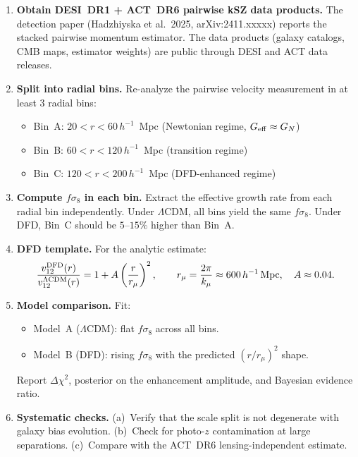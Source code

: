 \documentclass[11pt]{article}
\newcommand{\LCDM}{\Lambda\text{CDM}}
\newcommand{\Geff}{G_{\rm eff}}
\begin{document}
\begin{enumerate}[label=\textbf{K.\arabic*:}]
\item \textbf{Obtain DESI~DR1 + ACT~DR6 pairwise kSZ data products.}
  The detection paper (Hadzhiyska et al.\ 2025, arXiv:2411.xxxxx) reports
  the stacked pairwise momentum estimator. The data products (galaxy
  catalogs, CMB maps, estimator weights) are public through DESI and ACT
  data releases.

\item \textbf{Split into radial bins.} Re-analyze the pairwise velocity
  measurement in at least 3 radial bins:
  \begin{itemize}[nosep]
  \item Bin~A: $20 < r < 60\,h^{-1}$~Mpc (Newtonian regime, $\Geff \approx G_N$)
  \item Bin~B: $60 < r < 120\,h^{-1}$~Mpc (transition regime)
  \item Bin~C: $120 < r < 200\,h^{-1}$~Mpc (DFD-enhanced regime)
  \end{itemize}

\item \textbf{Compute $f\sigma_8$ in each bin.} Extract the effective
  growth rate from each radial bin independently. Under $\LCDM$, all
  bins yield the same $f\sigma_8$. Under DFD, Bin~C should be
  $5$--$15\%$ higher than Bin~A.

\item \textbf{DFD template.} For the analytic estimate:
  \begin{equation}
  \frac{v_{12}^{\rm DFD}(r)}{v_{12}^{\LCDM}(r)} = 1 + A\left(
  \frac{r}{r_\mu}\right)^2, \qquad r_\mu = \frac{2\pi}{k_\mu}
  \approx 600\,h^{-1}\,\text{Mpc}, \quad A \approx 0.04.
  \end{equation}

\item \textbf{Model comparison.} Fit:
  \begin{itemize}[nosep]
  \item Model~A ($\LCDM$): flat $f\sigma_8$ across all bins.
  \item Model~B (DFD): rising $f\sigma_8$ with the predicted
    $(r/r_\mu)^2$ shape.
  \end{itemize}
  Report $\Delta\chi^2$, posterior on the enhancement amplitude,
  and Bayesian evidence ratio.

\item \textbf{Systematic checks.} (a)~Verify that the scale split is
  not degenerate with galaxy bias evolution. (b)~Check for photo-$z$
  contamination at large separations. (c)~Compare with the ACT~DR6
  lensing-independent estimate.
\end{enumerate}
\end{document}
